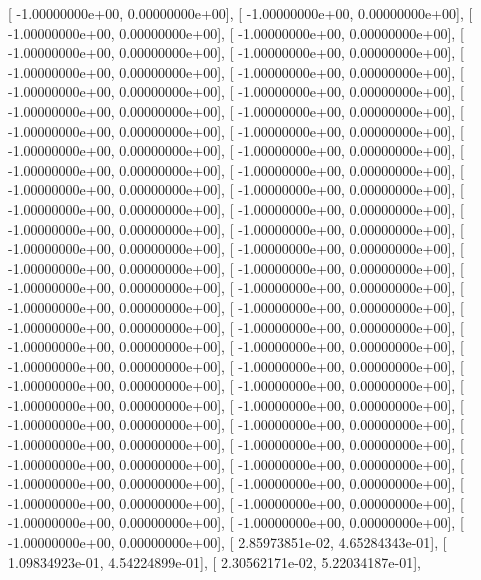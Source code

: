 \documentclass{article}
\begin{document}
       [ -1.00000000e+00,   0.00000000e+00],
       [ -1.00000000e+00,   0.00000000e+00],
       [ -1.00000000e+00,   0.00000000e+00],
       [ -1.00000000e+00,   0.00000000e+00],
       [ -1.00000000e+00,   0.00000000e+00],
       [ -1.00000000e+00,   0.00000000e+00],
       [ -1.00000000e+00,   0.00000000e+00],
       [ -1.00000000e+00,   0.00000000e+00],
       [ -1.00000000e+00,   0.00000000e+00],
       [ -1.00000000e+00,   0.00000000e+00],
       [ -1.00000000e+00,   0.00000000e+00],
       [ -1.00000000e+00,   0.00000000e+00],
       [ -1.00000000e+00,   0.00000000e+00],
       [ -1.00000000e+00,   0.00000000e+00],
       [ -1.00000000e+00,   0.00000000e+00],
       [ -1.00000000e+00,   0.00000000e+00],
       [ -1.00000000e+00,   0.00000000e+00],
       [ -1.00000000e+00,   0.00000000e+00],
       [ -1.00000000e+00,   0.00000000e+00],
       [ -1.00000000e+00,   0.00000000e+00],
       [ -1.00000000e+00,   0.00000000e+00],
       [ -1.00000000e+00,   0.00000000e+00],
       [ -1.00000000e+00,   0.00000000e+00],
       [ -1.00000000e+00,   0.00000000e+00],
       [ -1.00000000e+00,   0.00000000e+00],
       [ -1.00000000e+00,   0.00000000e+00],
       [ -1.00000000e+00,   0.00000000e+00],
       [ -1.00000000e+00,   0.00000000e+00],
       [ -1.00000000e+00,   0.00000000e+00],
       [ -1.00000000e+00,   0.00000000e+00],
       [ -1.00000000e+00,   0.00000000e+00],
       [ -1.00000000e+00,   0.00000000e+00],
       [ -1.00000000e+00,   0.00000000e+00],
       [ -1.00000000e+00,   0.00000000e+00],
       [ -1.00000000e+00,   0.00000000e+00],
       [ -1.00000000e+00,   0.00000000e+00],
       [ -1.00000000e+00,   0.00000000e+00],
       [ -1.00000000e+00,   0.00000000e+00],
       [ -1.00000000e+00,   0.00000000e+00],
       [ -1.00000000e+00,   0.00000000e+00],
       [ -1.00000000e+00,   0.00000000e+00],
       [ -1.00000000e+00,   0.00000000e+00],
       [ -1.00000000e+00,   0.00000000e+00],
       [ -1.00000000e+00,   0.00000000e+00],
       [ -1.00000000e+00,   0.00000000e+00],
       [ -1.00000000e+00,   0.00000000e+00],
       [ -1.00000000e+00,   0.00000000e+00],
       [ -1.00000000e+00,   0.00000000e+00],
       [ -1.00000000e+00,   0.00000000e+00],
       [ -1.00000000e+00,   0.00000000e+00],
       [ -1.00000000e+00,   0.00000000e+00],
       [ -1.00000000e+00,   0.00000000e+00],
       [ -1.00000000e+00,   0.00000000e+00],
       [ -1.00000000e+00,   0.00000000e+00],
       [ -1.00000000e+00,   0.00000000e+00],
       [  2.85973851e-02,   4.65284343e-01],
       [  1.09834923e-01,   4.54224899e-01],
       [  2.30562171e-02,   5.22034187e-01],
\end{document}
